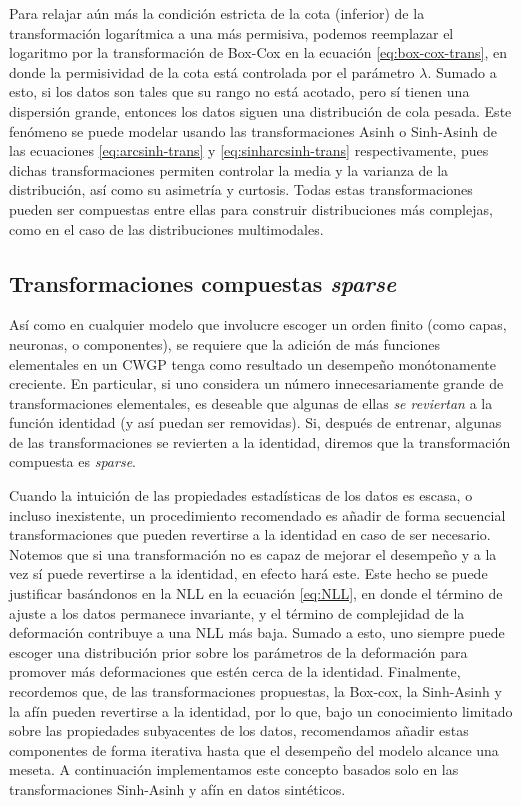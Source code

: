 Para relajar aún más la condición estricta de la cota (inferior) de la transformación logarítmica a una más permisiva, podemos reemplazar el logaritmo por la transformación de Box-Cox en la ecuación \eqref{eq:box-cox-trans}, en donde la permisividad de la cota está controlada por el parámetro \(\lambda\). Sumado a esto, si los datos son tales que su rango no está acotado, pero sí tienen una dispersión grande, entonces los datos siguen una distribución de cola pesada. Este fenómeno se puede modelar usando las transformaciones Asinh o Sinh-Asinh de las ecuaciones \eqref{eq:arcsinh-trans} y \eqref{eq:sinharcsinh-trans} respectivamente, pues dichas transformaciones permiten controlar la media y la varianza de la distribución, así como su asimetría y curtosis. Todas estas transformaciones pueden ser compuestas entre ellas para construir distribuciones más complejas, como en el caso de las distribuciones multimodales.

\subsection{Transformaciones compuestas \emph{sparse}}
\label{sub:sparse_trans}

Así como en cualquier modelo que involucre escoger un orden finito (como capas, neuronas, o componentes), se requiere que la adición de más funciones elementales en un CWGP tenga como resultado un desempeño monótonamente creciente. En particular, si uno considera un número innecesariamente grande de transformaciones elementales, es deseable que algunas de ellas \emph{se reviertan} a la función identidad (y así puedan ser removidas). Si, después de entrenar, algunas de las transformaciones se revierten a la identidad, diremos que la transformación compuesta es \emph{sparse}.

Cuando la intuición de las propiedades estadísticas de los datos es escasa, o incluso inexistente, un procedimiento recomendado es añadir de forma secuencial transformaciones que pueden revertirse a la identidad en caso de ser necesario. Notemos que si una transformación no es capaz de mejorar el desempeño y a la vez sí puede revertirse a la identidad, en efecto hará este. Este hecho se puede justificar basándonos en la NLL en la ecuación \eqref{eq:NLL}, en donde el término de ajuste a los datos permanece invariante, y el término de complejidad de la deformación contribuye a una NLL más baja. Sumado a esto, uno siempre puede escoger una distribución prior sobre los parámetros de la deformación para promover más deformaciones que estén cerca de la identidad. Finalmente, recordemos que, de las transformaciones propuestas, la Box-cox, la Sinh-Asinh y la afín pueden revertirse a la identidad, por lo que, bajo un conocimiento limitado sobre las propiedades subyacentes de los datos, recomendamos añadir estas componentes de forma iterativa hasta que el desempeño del modelo alcance una meseta. A continuación implementamos este concepto basados solo en las transformaciones Sinh-Asinh y afín en datos sintéticos.

